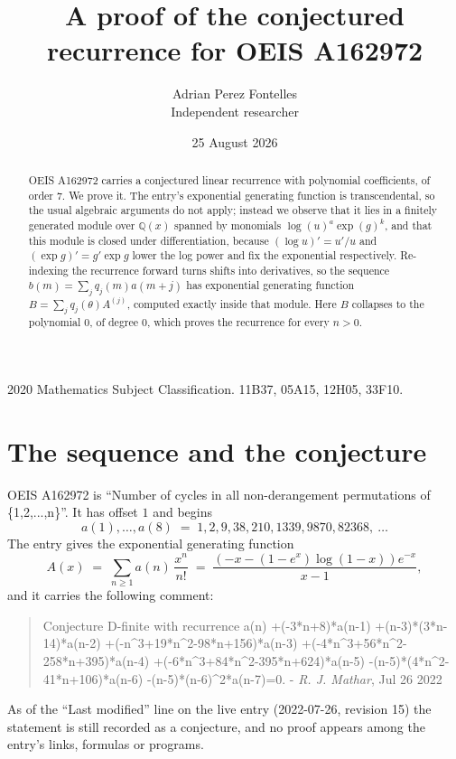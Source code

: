 \documentclass[11pt,a4paper]{article}
\title{A proof of the conjectured recurrence for OEIS A162972}
\author{Adrian Perez Fontelles\\ \small Independent researcher}
\date{25 August 2026}
\theoremstyle{plain}
\theoremstyle{definition}
\begin{document}
\maketitle

\begin{abstract}
OEIS A162972 carries a conjectured linear recurrence with polynomial coefficients, of
order 7. We prove it. The entry's exponential generating function is
transcendental, so the usual algebraic arguments do not apply; instead we observe that it
lies in a finitely generated module over $\mathbb{Q}(x)$ spanned by monomials
$\log(u)^{a}\exp(g)^{k}$, and that this module is closed under differentiation, because
$(\log u)'=u'/u$ and $(\exp g)'=g'\exp g$ lower the log power and fix the exponential
respectively. Re-indexing the recurrence forward turns shifts into derivatives, so the
sequence $b(m)=\sum_{j}q_{j}(m)a(m+j)$ has exponential generating function
$B=\sum_{j}q_{j}(\theta)A^{(j)}$, computed exactly inside that module. Here $B$ collapses
to the polynomial $0$, of degree $0$, which proves the recurrence for every
$n>0$.
\end{abstract}

\noindent\small 2020 Mathematics Subject Classification. 11B37, 05A15, 12H05, 33F10.\normalsize

\section{The sequence and the conjecture}

OEIS A162972 is ``Number of cycles in all non-derangement permutations of \{1,2,...,n\}''. It has offset $1$ and begins
\[
a(1),\dots,a(8)\;=\;1, 2, 9, 38, 210, 1339, 9870, 82368,\ \dots
\]
The entry gives the exponential generating function
\begin{equation}\label{eq:gf}
A(x)\;=\;\sum_{n\ge 1} a(n)\,\frac{x^{n}}{n!}\;=\;\frac{\left(- x - \left(1 - e^{x}\right) \log{\left(1 - x \right)}\right) e^{- x}}{x - 1} ,
\end{equation}
and it carries the following comment:
\begin{quote}\small
Conjecture D-finite with recurrence a(n) +(-3*n+8)*a(n-1) +(n-3)*(3*n-14)*a(n-2) +(-n\^{}3+19*n\^{}2-98*n+156)*a(n-3) +(-4*n\^{}3+56*n\^{}2-258*n+395)*a(n-4) +(-6*n\^{}3+84*n\^{}2-395*n+624)*a(n-5) -(n-5)*(4*n\^{}2-41*n+106)*a(n-6) -(n-5)*(n-6)\^{}2*a(n-7)=0. - \emph{R. J. Mathar}, Jul 26 2022
\end{quote}
As of the ``Last modified'' line on the live entry (2022-07-26, revision 15) the
statement is still recorded as a conjecture, and no proof appears among the entry's links,
formulas or programs.
\end{document}
